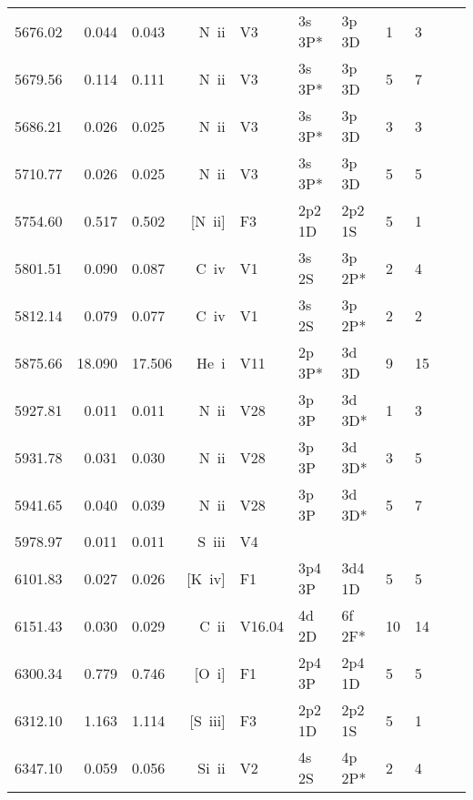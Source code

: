 \begin{longtable}{lrlrlllllll}
 5676.02 &   0.044 &   0.043 &  N~{\sc ii}      &  V3        &  3s 3P*    &  3p 3D     &          1 &        3    \\
 5679.56 &   0.114 &   0.111 &  N~{\sc ii}      &  V3        &  3s 3P*    &  3p 3D     &          5 &        7    \\
 5686.21 &   0.026 &   0.025 &  N~{\sc ii}      &  V3        &  3s 3P*    &  3p 3D     &          3 &        3    \\
 5710.77 &   0.026 &   0.025 &  N~{\sc ii}      &  V3        &  3s 3P*    &  3p 3D     &          5 &        5    \\
 5754.60 &   0.517 &   0.502 &  [N~{\sc ii}]    &  F3        &  2p2 1D    &  2p2 1S    &          5 &        1    \\
 5801.51 &   0.090 &   0.087 &  C~{\sc iv}      &  V1        &  3s 2S     &  3p 2P*    &          2 &        4    \\
 5812.14 &   0.079 &   0.077 &  C~{\sc iv}      &  V1        &  3s 2S     &  3p 2P*    &          2 &        2    \\
 5875.66 &  18.090 &  17.506 &  He~{\sc i}      &  V11       &  2p 3P*    &  3d 3D     &          9 &       15    \\
 5927.81 &   0.011 &   0.011 &  N~{\sc ii}      &  V28       &  3p 3P     &  3d 3D*    &          1 &        3    \\
 5931.78 &   0.031 &   0.030 &  N~{\sc ii}      &  V28       &  3p 3P     &  3d 3D*    &          3 &        5    \\
 5941.65 &   0.040 &   0.039 &  N~{\sc ii}      &  V28       &  3p 3P     &  3d 3D*    &          5 &        7    \\
 5978.97 &   0.011 &   0.011 &  S~{\sc iii}     &  V4        &            &            &            &             \\
 6101.83 &   0.027 &   0.026 &  [K~{\sc iv}]    &  F1        &  3p4 3P    &  3d4 1D    &          5 &        5    \\
 6151.43 &   0.030 &   0.029 &  C~{\sc ii}      &   V16.04   &  4d 2D     &  6f 2F*    &         10 &       14    \\
 6300.34 &   0.779 &   0.746 &  [O~{\sc i}]     &  F1        &  2p4 3P    &  2p4 1D    &          5 &        5    \\
 6312.10 &   1.163 &   1.114 &  [S~{\sc iii}]   &  F3        &  2p2 1D    &  2p2 1S    &          5 &        1    \\
 6347.10 &   0.059 &   0.056 &  Si~{\sc ii}     &  V2        &  4s 2S     &  4p 2P*    &          2 &        4    \\

\end{longtable}
